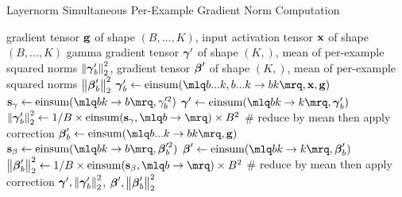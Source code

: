\begin{algorithm}
\caption{Layernorm Simultaneous Per-Example Gradient Norm Computation}
\label{alg:ln-layer}
\begin{algorithmic}[1]
\Require gradient tensor $\mathbf{g}$ of shape $(B, ..., K)$, input activation tensor $\mathbf{x}$ of shape $(B, ..., K)$
\Ensure gamma gradient tensor $\boldsymbol{\gamma}'$ of shape $(K,)$, mean of per-example squared norms $\left\lVert\boldsymbol{\gamma}_b'\right\rVert_2^2$, gradient tensor $\boldsymbol{\beta}'$ of shape $(K,)$, mean of per-example squared norms $\left\lVert\boldsymbol{\beta}_b'\right\rVert_2^2$
\State $\gammaB_b' \gets \text{einsum}(\mlq b...k,b...k \rightarrow bk \mrq, \xB, \gB)$
\State $\sB_{\gamma} \gets \text{einsum}(\mlq b k \rightarrow b \mrq, \gamma_b'^2)$
\State $\gammaB' \gets \text{einsum}(\mlq b k \rightarrow k \mrq, \gammaB_b')$
\State $\sqn{\gammaB_b'} \gets 1/B \times \text{einsum}(\sB_\gamma, \mlq b \rightarrow \mrq) \times B^2$ \# reduce by mean then apply correction
\State $\betaB_b' \gets \text{einsum}(\mlq b...k \rightarrow bk \mrq, \gB)$
\State $\sB_{\beta} \gets \text{einsum}(\mlq b k \rightarrow b \mrq, \betaB_b'^2)$
\State $\betaB' \gets \text{einsum}(\mlq b k \rightarrow k \mrq, \betaB_b')$
\State $\sqn{\betaB_b'} \gets 1/B \times \text{einsum}(\sB_\beta, \mlq b \rightarrow \mrq) \times B^2$ \# reduce by mean then apply correction
\State \Return $\boldsymbol{\gamma}', \left\lVert\boldsymbol{\gamma}_b'\right\rVert_2^2$, $\boldsymbol{\beta}', \left\lVert\boldsymbol{\beta}_b'\right\rVert_2^2$
\end{algorithmic}
\end{algorithm}
